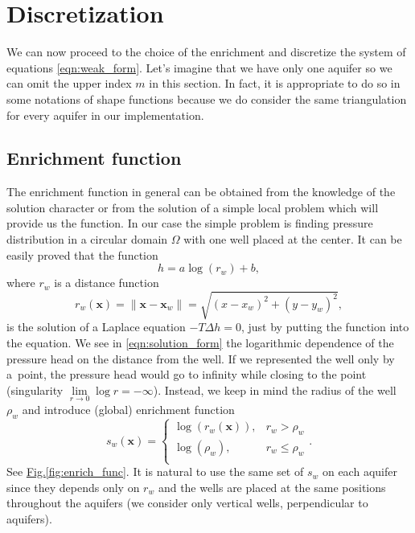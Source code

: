\documentclass[preprint,12pt]{elsarticle}
\newcommand{\fig}[1]{\hyperref[#1]{Fig.\ref{#1}}}
\def\vc#1{\mathbf{\boldsymbol{#1}}}     %
\newcommand{\bx}{\vc{x}}
\begin{document}
\section{Discretization}
\label{sec:discretization}
We can now proceed to the choice of the enrichment and discretize the system of equations
\eqref{eqn:weak_form}.
Let's imagine that we have only one aquifer so we can omit the upper index $m$ in this section.
In fact, it is appropriate to do so in some notations of shape functions because we do consider the same 
triangulation for every aquifer in our implementation.

\subsection{Enrichment function}
The enrichment function in general can be obtained from the knowledge of the solution character or 
from the solution of a simple local problem which will provide us the function.
In our case the simple problem is finding pressure distribution in a circular domain $\Omega$ with one well 
placed at the center. It can be easily proved that the function
%
\begin{equation} \label{eqn:solution_form}
  h = a \log(r_w)+b, %
\end{equation}
where $r_w$ is a distance function
\begin{equation} \label{eqn:distance}
r_w(\vc{x}) = \|\bx - \vc{x}_w\|= \sqrt{(x-x_w)^2+(y-y_w)^2},
\end{equation}
%
is the solution of a Laplace equation $-T \Delta h = 0$, just by putting the function into the equation. 
%
We see in \eqref{eqn:solution_form} the logarithmic dependence of the pressure head on the distance from 
the well. If we represented the well only by a~point, the pressure head would go to infinity while closing 
to the point (singularity $\lim \limits_{r\rightarrow 0} \log r= -\infty$). Instead, we keep in mind the
radius of the well $\rho_w$ and introduce (global) enrichment function
%
\begin{equation}
\label{eqn:enrich_func}
s_w(\bx) = 
  \begin{cases}
  \log(r_w(\bx)), & r_w > \rho_w\\
  \log(\rho_w), & r_w \le \rho_w\\
  \end{cases}.
\end{equation}
See \fig{fig:enrich_func}.
It is natural to use the same set of $s_w$ on each aquifer since they depends only on $r_w$ and the wells are 
placed at the same positions throughout the aquifers (we consider only vertical wells, perpendicular to aquifers).
%
\end{document}
